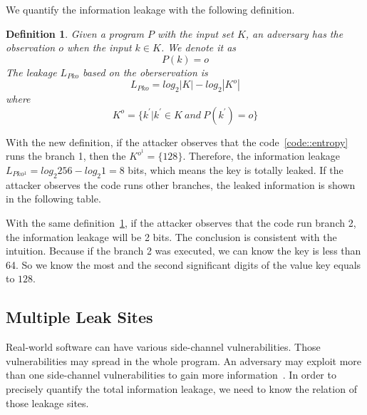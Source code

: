 We quantify the information leakage with the following definition. 

\newtheorem{mydef}{Definition}

\begin{mydef}
\label{def}
Given a program $P$ with the input set $K$, 
an adversary has the observation $o$ when the input $k{\in}K$. 
We denote it as
    $$P(k) = o$$
The leakage $L_{Pko}$ based on the oberservation is
    $$L_{Pko} = log_2{|K|} - log_2{|K^o|}$$
    where
    $$K^o = \{k^{'} | k^{'}{\in}K \ and \ P(k^{'}) = o \}$$
\end{mydef}

With the new definition, if the attacker observes that the code~\ref{code::entropy} runs the branch 1, 
then the $K^{o^{1}} = \{128\}$. Therefore, the information leakage $L_{Pko^{1}} = log_2{256} - log_2{1} = 8$
bits, which means the key is totally leaked. If the attacker observes the code runs other
branches, the leaked information is shown in the following table.

\begin{table}[h]
    \centering
    \caption{The leaked information by the definition~\ref{def}}
\end{table}

With the same definition~\ref{def}, if the attacker observes that the code run branch 2, the information
leakage will be 2 bits. The conclusion is consistent with the intuition. Because if the branch 2 was
executed, we can know the key is less than 64. So we know the most and the second significant digits of 
the value key equals to $128$.

\subsection{Multiple Leak Sites}
Real-world software can have various side-channel vulnerabilities. Those vulnerabilities 
may spread in the whole program. An adversary may exploit more than one side-channel vulnerabilities 
to gain more information~\cite{7163052, 191010}. In order to precisely quantify the
total information leakage, we need to know the relation of those leakage sites. 


